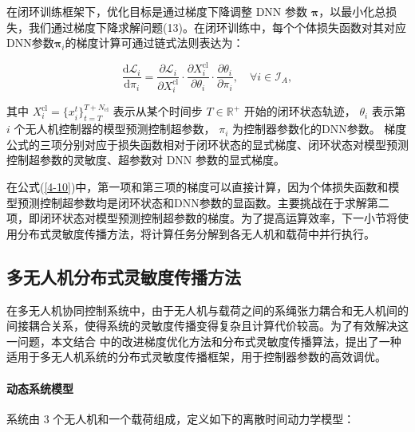\documentclass[lang=chs, degree=master, blindreview=false, winfonts=true]{yanputhesis}
\begin{document}
在闭环训练框架下，优化目标是通过梯度下降调整 DNN 参数 $\bm \pi$，以最小化总损失，我们通过梯度下降求解问题(13)。在闭环训练中，每个个体损失函数对其对应DNN参数$\bm \pi_i$的梯度计算可通过链式法则表达为：

\begin{equation}
	\label{4-10}
\frac{\mathrm{d}\mathcal{L}_i}{\mathrm{d}\pi_i} = \frac{\partial \mathcal{L}_i}{\partial X_i^\text{cl}} \cdot \frac{\partial X_i^\text{cl}}{\partial \theta_i} \cdot \frac{\partial \theta_i}{\partial \pi_i}, \quad \forall i \in \mathcal{I}_A,
\end{equation}

其中 \( X_i^\text{cl} = \{x_i^t\}_{t=T}^{T+N_\text{cl}} \) 表示从某个时间步 \( T \in \mathbb{R}^+ \) 开始的闭环状态轨迹， $\theta_i$ 表示第 $i$ 个无人机控制器的模型预测控制超参数， $\pi_i$ 为控制器参数化的DNN参数。
梯度公式的三项分别对应于损失函数相对于闭环状态的显式梯度、闭环状态对模型预测控制超参数的灵敏度、超参数对 DNN 参数的显式梯度。


在公式(\ref{4-10})中，第一项和第三项的梯度可以直接计算，因为个体损失函数和模型预测控制超参数均是闭环状态和DNN参数的显函数。主要挑战在于求解第二项，即闭环状态对模型预测控制超参数的梯度。为了提高运算效率，下一小节将使用分布式灵敏度传播方法，将计算任务分解到各无人机和载荷中并行执行。


\subsection{多无人机分布式灵敏度传播方法}

在多无人机协同控制系统中，由于无人机与载荷之间的系绳张力耦合和无人机间的间接耦合关系，使得系统的灵敏度传播变得复杂且计算代价较高。为了有效解决这一问题，本文结合 \cite{cheng2023difftune} 中的改进梯度优化方法和分布式灵敏度传播算法，提出了一种适用于多无人机系统的分布式灵敏度传播框架，用于控制器参数的高效调优。

\paragraph{动态系统模型}  
系统由 3 个无人机和一个载荷组成，定义如下的离散时间动力学模型：
\end{document}
